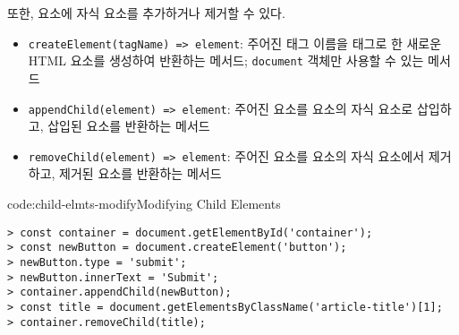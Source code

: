 또한, 요소에 자식 요소를 추가하거나 제거할 수 있다.

\begin{itemize}
    \item \texttt{createElement(tagName) => element}: 주어진 태그 이름을 태그로 한 새로운 HTML 요소를 생성하여 반환하는 메서드; \texttt{document} 객체만 사용할 수 있는 메서드
    \item \texttt{appendChild(element) => element}: 주어진 요소를 요소의 자식 요소로 삽입하고, 삽입된 요소를 반환하는 메서드
    \item \texttt{removeChild(element) => element}: 주어진 요소를 요소의 자식 요소에서 제거하고, 제거된 요소를 반환하는 메서드
\end{itemize}

\begin{codeenv}{code:child-elmts-modify}{Modifying Child Elements}\begin{verbatim}
> const container = document.getElementById('container');
> const newButton = document.createElement('button');
> newButton.type = 'submit';
> newButton.innerText = 'Submit';
> container.appendChild(newButton);
> const title = document.getElementsByClassName('article-title')[1];
> container.removeChild(title);
\end{verbatim}
\end{codeenv}
